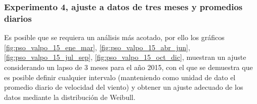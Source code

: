 \subsubsection{Experimento 4, ajuste a datos de tres meses y promedios diarios}
Es posible que se requiera un análisis más acotado, por ello los gráficos \ref{fig:pso_valpo_15_ene_mar}, \ref{fig:pso_valpo_15_abr_jun}, 
\ref{fig:pso_valpo_15_jul_sep}, \ref{fig:pso_valpo_15_oct_dic}, muestran un ajuste considerando un lapso de 3 meses para el año 2015, con el
que se demuestra que es posible definir cualquier intervalo (manteniendo como unidad de dato el promedio diario de velocidad del viento)
 y obtener un ajuste adecuado de los datos mediante la distribución de Weibull.

\begin{figure}[ht!]
    \centering
    \captionsetup{justification=centering,margin=2cm}
    \\  
\end{figure}

